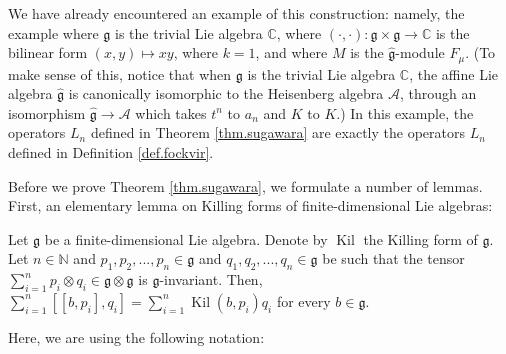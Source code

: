 \documentclass[etingof-lie.tex]{subfiles}
\begin{document}
\begin{remark}
\label{rmk.sugawara.fockvir}We have already encountered an example of this
construction: namely, the example where $\mathfrak{g}$ is the trivial Lie
algebra $\mathbb{C}$, where $\left(  \cdot,\cdot\right)  :\mathfrak{g}%
\times\mathfrak{g}\rightarrow\mathbb{C}$ is the bilinear form $\left(
x,y\right)  \mapsto xy$, where $k=1$, and where $M$ is the
$\widehat{\mathfrak{g}}$-module $F_{\mu}$. (To make sense of this, notice that
when $\mathfrak{g}$ is the trivial Lie algebra $\mathbb{C}$, the affine Lie
algebra $\widehat{\mathfrak{g}}$ is canonically isomorphic to the Heisenberg
algebra $\mathcal{A}$, through an isomorphism $\widehat{\mathfrak{g}%
}\rightarrow\mathcal{A}$ which takes $t^{n}$ to $a_{n}$ and $K$ to $K$.) In
this example, the operators $L_{n}$ defined in Theorem \ref{thm.sugawara} are
exactly the operators $L_{n}$ defined in Definition \ref{def.fockvir}.
\end{remark}

Before we prove Theorem \ref{thm.sugawara}, we formulate a number of lemmas.
First, an elementary lemma on Killing forms of finite-dimensional Lie algebras:

\begin{lemma}
\label{lem.sugawara.Kil}Let $\mathfrak{g}$ be a finite-dimensional Lie
algebra. Denote by $\operatorname*{Kil}$ the Killing form of $\mathfrak{g}$.
Let $n\in\mathbb{N}$ and $p_{1},p_{2},...,p_{n}\in\mathfrak{g}$ and
$q_{1},q_{2},...,q_{n}\in\mathfrak{g}$ be such that the tensor $\sum
\limits_{i=1}^{n}p_{i}\otimes q_{i}\in\mathfrak{g}\otimes\mathfrak{g}$ is
$\mathfrak{g}$-invariant. Then, $\sum\limits_{i=1}^{n}\left[  \left[
b,p_{i}\right]  ,q_{i}\right]  =\sum\limits_{i=1}^{n}\operatorname*{Kil}%
\left(  b,p_{i}\right)  q_{i}$ for every $b\in\mathfrak{g}$.
\end{lemma}

Here, we are using the following notation:
\end{document}
